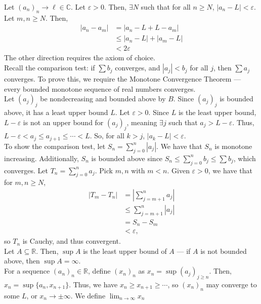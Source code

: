 \documentclass[10pt]{extarticle}
\newcommand{\R}{\mathbb{R}}
\newcommand{\C}{\mathbb{C}}
\begin{document}
  Let $(a_n)_n\rightarrow \ell\in \C$. Let $\varepsilon > 0$. Then, $\exists N$ such that for all $n\geq N$, $|a_n - L| < \varepsilon$. Let $m,n \geq N$. Then,
  \begin{align*}
    |a_n - a_m| &= |a_n - L + L - a_m|\\
                &\leq |a_n - L| + |a_m - L|\\
                &< 2\varepsilon
  \end{align*}
  The other direction requires the axiom of choice.\\

  Recall the comparison test: if $\sum b_j$ converges, and $|a_j| < b_j$ for all $j$, then $\sum a_j$ converges. To prove this, we require the Monotone Convergence Theorem --- every bounded monotone sequence of real numbers converges.\\

  Let $(a_j)_j$ be nondecreasing and bounded above by $B$. Since $(a_j)_j$ is bounded above, it has a least upper bound $L$. Let $\varepsilon > 0$. Since $L$ is the least upper bound, $L-\varepsilon$ is not an upper bound for $(a_j)_j$, meaning $\exists j$ such that $a_j > L - \varepsilon$. Thus, $L-\varepsilon < a_j \leq a_{j+1} \leq \cdots < L$. So, for all $k  > j$, $|a_k - L| < \varepsilon$.\\

  To show the comparison test, let $S_n = \sum_{j=0}^{n}|a_j|$. We have that $S_n$ is monotone increasing. Additionally, $S_n$ is bounded above since $S_n \leq \sum_{j=0}^{n} b_j \leq \sum b_j$, which converges. Let $T_n = \sum_{j=0}^{n}a_j$. Pick $m,n$ with $m < n$. Given $\varepsilon > 0$, we have that for $m,n \geq N$,
  \begin{align*}
    |T_m - T_n| &= \left|\sum_{j=m+1}^{n}a_j\right|\\
                &\leq \sum_{j=m+1}^{n}|a_j|\\
                &= S_n - S_m\\
                &< \varepsilon,
  \end{align*}
  so $T_n$ is Cauchy, and thus convergent.\\

  Let $A\subseteq \R$. Then, $\sup A$ is the least upper bound of $A$ --- if $A$ is not bounded above, then $\sup A = \infty$.\\

  For a sequence $(a_n)_n\in \R$, define $(x_n)_n$ as $x_n = \sup (a_j)_{j\geq n}$. Then, $x_n = \sup\{a_n,x_{n+1}\}$. Thus, we have $x_n \geq x_{n+1} \geq \cdots$, so $(x_n)_n$ may converge to some $L$, or $x_n \rightarrow \pm\infty$. We define $\lim_{n\rightarrow\infty}x_n$\\
\end{document}
